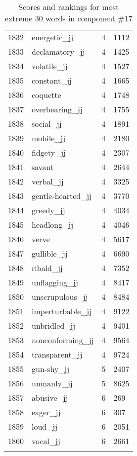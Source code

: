 \begin{longtable}[!htbp]{| rlr@{.}l |}
    1832 & energetic\_jj & 4 & 1112 \\
    1833 & declamatory\_jj & 4 & 1425 \\
    1834 & volatile\_jj & 4 & 1527 \\
    1835 & constant\_jj & 4 & 1665 \\
    1836 & coquette & 4 & 1748 \\
    1837 & overbearing\_jj & 4 & 1755 \\
    1838 & social\_jj & 4 & 1891 \\
    1839 & mobile\_jj & 4 & 2180 \\
    1840 & fidgety\_jj & 4 & 2307 \\
    1841 & savant & 4 & 2644 \\
    1842 & verbal\_jj & 4 & 3325 \\
    1843 & gentle-hearted\_jj & 4 & 3770 \\
    1844 & greedy\_jj & 4 & 4034 \\
    1845 & headlong\_jj & 4 & 4046 \\
    1846 & verve & 4 & 5617 \\
    1847 & gullible\_jj & 4 & 6690 \\
    1848 & ribald\_jj & 4 & 7352 \\
    1849 & unflagging\_jj & 4 & 8417 \\
    1850 & unscrupulous\_jj & 4 & 8484 \\
    1851 & imperturbable\_jj & 4 & 9122 \\
    1852 & unbridled\_jj & 4 & 9401 \\
    1853 & nonconforming\_jj & 4 & 9564 \\
    1854 & transparent\_jj & 4 & 9724 \\
    1855 & gun-shy\_jj & 5 & 2407 \\
    1856 & unmanly\_jj & 5 & 8625 \\
    1857 & abusive\_jj & 6 & 269 \\
    1858 & eager\_jj & 6 & 307 \\
    1859 & loud\_jj & 6 & 2051 \\
    1860 & vocal\_jj & 6 & 2661 \\
    \hline
    \caption{Scores and rankings for most extreme 30 words in component \#17} \\
\end{longtable}
